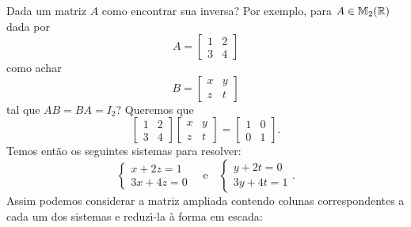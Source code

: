 Dada um matriz $A$ como encontrar sua inversa? Por exemplo, para $A \in \mathbb{M}_2(\mathbb{R})$ dada por
\[
	A =
	\begin{bmatrix}
		1 & 2\\
		3 & 4
	\end{bmatrix}
\]
como achar
\[
	B =
	\begin{bmatrix}
		x & y\\
		z & t
	\end{bmatrix}
\]
tal que $AB = BA = I_2$? Queremos que
\[
	\begin{bmatrix}
		1 & 2\\
		3 & 4
	\end{bmatrix}
	\begin{bmatrix}
		x & y\\
		z & t
	\end{bmatrix} = 
	\begin{bmatrix}
		1 & 0\\
		0 & 1
	\end{bmatrix}.
\]
Temos ent\~ao os seguintes sistemas para resolver:
\[
	\begin{cases}
		x + 2z = 1\\
		3x + 4z = 0
	\end{cases} \quad \mbox{e}\quad
	\begin{cases}
		y + 2t = 0\\
		3y + 4t = 1
	\end{cases}.
\]
Assim podemos considerar a matriz ampliada contendo colunas correspondentes a cada um dos sistemas e reduz{\'\i}-la \`a forma em escada:

